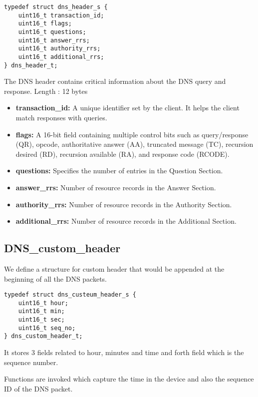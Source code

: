 \documentclass[12pt, a4paper]{report}
\begin{document}
\begin{lstlisting}[caption={DNS Header Structure}]
typedef struct dns_header_s {
    uint16_t transaction_id;
    uint16_t flags;
    uint16_t questions;
    uint16_t answer_rrs;
    uint16_t authority_rrs;
    uint16_t additional_rrs;
} dns_header_t;
\end{lstlisting}

The DNS header contains critical information about the DNS query and response. Length : 12 bytes

\begin{itemize}
    \item \textbf{transaction\_id:} A unique identifier set by the client. It helps the client match responses with queries.
    \item \textbf{flags:} A 16-bit field containing multiple control bits such as query/response (QR), opcode, authoritative answer (AA), truncated message (TC), recursion desired (RD), recursion available (RA), and response code (RCODE).
    \item \textbf{questions:} Specifies the number of entries in the Question Section.
    \item \textbf{answer\_rrs:} Number of resource records in the Answer Section.
    \item \textbf{authority\_rrs:} Number of resource records in the Authority Section.
    \item \textbf{additional\_rrs:} Number of resource records in the Additional Section.
\end{itemize}

\subsection{DNS\_custom\_header}

We define a structure for custom header that would be appended at the beginning of all the DNS packets.

\begin{lstlisting}[caption={custom DNS header structure}]
typedef struct dns_custeum_header_s {
    uint16_t hour;
    uint16_t min;
    uint16_t sec;
    uint16_t seq_no;
} dns_custom_header_t;
\end{lstlisting}

It stores 3 fields related to hour, minutes and time and forth field which is the sequence number.

Functions are invoked which capture the time in the device and also the sequence ID of the DNS packet.
\end{document}
